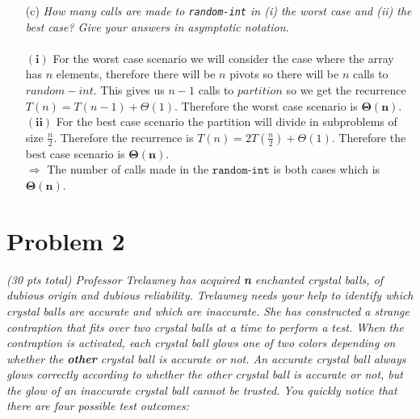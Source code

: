 \documentclass[12pt]{article} \setlength{\oddsidemargin}{0in}
\begin{document}
{\begin{enumerate}
This is when we do our last and $\mathbf{fourth}$ comparison.  \\\\
    
   
  \item[(c)]{\textit{How many calls are made to \texttt{random-int} in (i) the	%
      worst case and (ii) the best case? Give your answers in
      asymptotic notation.}}
    \\\\
    $\mathbf{(i)}$ For the worst case scenario we will consider the case where the array has $n$ elements, therefore there will be $n$ pivots so there will be $n$ calls to $random-int$. This gives us $n-1$ calls to $partition$ so we get the recurrence  $T(n) = T(n-1) +\Theta (1)$. Therefore the worst case scenario is $\mathbf{\Theta(n)}$.\\
$\mathbf{(ii)}$ For the best case scenario the partition will divide in subproblems of size $\frac{n}{2}$. Therefore the recurrence is $T(n) = 2T(\frac{n}{2}) + \Theta(1)$. Therefore the best case scenario is  $\mathbf{\Theta(n)}$.\\
$\Rightarrow$ The number of calls made in the $\texttt{random-int}$ is both cases which is $\mathbf{\Theta(n)}$.\\

  \end{enumerate}

  \section*{Problem 2}

  \textit{(30 pts total) Professor Trelawney has acquired \textbf{n}
    enchanted crystal balls, of dubious origin and dubious
    reliability. Trelawney needs your help to identify which crystal
    balls are accurate and which are inaccurate. She has constructed a
    strange contraption that fits over two crystal balls at a time
    to perform a test. When the contraption is activated, each crystal
    ball glows one of two colors depending on whether the
    \textbf{other} crystal ball is accurate or not. An accurate
    crystal ball always glows correctly according to whether the other
    crystal ball is accurate or not, but the glow of an inaccurate
    crystal ball cannot be trusted. You quickly notice that there are
    four possible test outcomes:}

}
\end{document}
